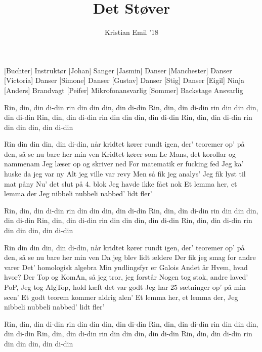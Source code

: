 \documentclass[a4paper,11pt]{article}
\title{Det Støver}
\author{Kristian Emil '18}
\begin{document}
\maketitle

\begin{roles}
[Buchter] Instruktør
[Johan] Sanger
[Jasmin] Danser
[Manchester] Danser
[Victoria] Danser
[Simone] Danser
[Gustav] Danser
[Stig] Danser
[Eigil] Ninja
[Anders] Brandvagt
[Peifer] Mikrofonansvarlig
[Sommer] Backstage Ansvarlig
\end{roles}

\begin{song}
 Rin, din, din di-din
rin din din din, din di-din
Rin, din, din di-din
rin din din din, din di-din
Rin, din, din di-din
rin din din din, din di-din
Rin, din, din di-din
rin din din din, din di-din

 Rin din din din, din di-din, når kridtet kører rundt igen,
der' teoremer op' på den, så se nu bare her min ven
Kridtet kører som Le Mans, det korollar og nammenam
Jeg læser op og skriver ned
For matematik er fucking fed
Jeg ka' huske da jeg var ny
Alt jeg ville var revy
Men så fik jeg analys'
Jeg fik lyst til mat påny
Nu' det slut på 4. blok
Jeg havde ikke fået nok
Et lemma her, et lemma der
Jeg nibbeli nubbeli nabbed' lidt fler'

 Rin, din, din di-din
rin din din din, din di-din
Rin, din, din di-din
rin din din din, din di-din
Rin, din, din di-din
rin din din din, din di-din
Rin, din, din di-din
rin din din din, din di-din

 Rin din din din, din di-din, når kridtet kører rundt igen,
der' teoremer op' på den, så se nu bare her min ven
Da jeg blev lidt ældere
Der fik jeg smag for andre varer
Det' homologisk algebra
Min yndlingsfyr er Galois
Andet år
Hvem, hvad hvor?
Der Top og KomAn, så jeg tror, jeg forstår
Nogen tog stok, andre laved' PoP,
Jeg tog AlgTop, hold kæft det var godt
Jeg har 25 sætninger op' på min scen'
Et godt teorem kommer aldrig alen'
Et lemma her, et lemma der,
Jeg nibbeli nubbeli nabbed' lidt fler'

 Rin, din, din di-din
rin din din din, din di-din
Rin, din, din di-din
rin din din din, din di-din
Rin, din, din di-din
rin din din din, din di-din
Rin, din, din di-din
rin din din din, din di-din
\end{song}
\end{document}
